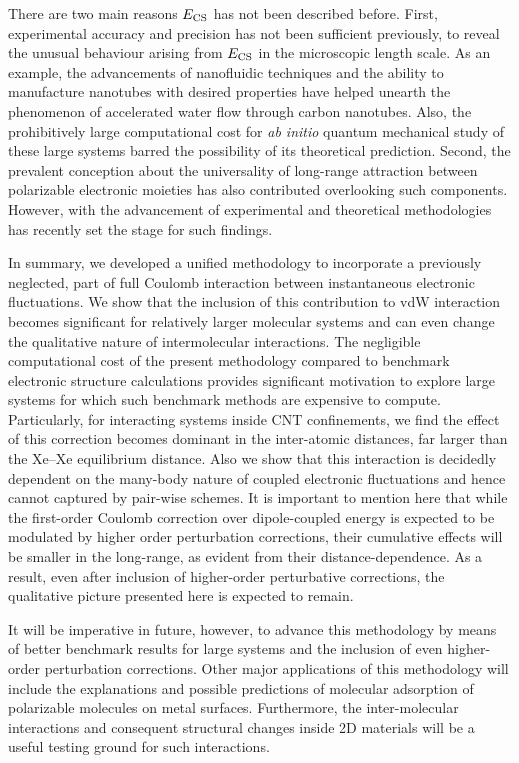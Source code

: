 \documentclass[aps,prl,groupaddress, twocolumn]{revtex4-1}  %
\begin{document}
There are two main reasons $E_{\rm CS}$ has not been described before. First, experimental accuracy and precision has not been sufficient previously, to reveal the unusual behaviour arising from $E_{\rm CS}$ in the microscopic length scale. As an example, the advancements of nanofluidic techniques and the ability to manufacture nanotubes with desired properties have helped unearth the phenomenon of accelerated water flow through carbon nanotubes. Also, the prohibitively large computational cost for \textit{ab initio} quantum mechanical study of these large systems barred the possibility of its theoretical prediction. Second, the prevalent conception about the universality of long-range attraction between polarizable electronic moieties has also contributed overlooking such components. However, with the advancement of experimental and theoretical methodologies has recently set the stage for such findings.

In summary, we developed a unified methodology to incorporate a previously neglected, part of full Coulomb interaction between instantaneous electronic fluctuations. We show that the inclusion of this contribution to vdW interaction becomes significant for relatively larger molecular systems and can even change the qualitative nature of intermolecular interactions. The negligible computational cost of the present methodology compared to benchmark electronic structure calculations provides significant motivation to explore large systems for which such benchmark methods are expensive to compute. Particularly, for interacting systems inside CNT confinements, we find the effect of this correction becomes dominant in the inter-atomic distances, far larger than the Xe--Xe equilibrium distance. Also we show that this interaction is decidedly dependent on the many-body nature of coupled electronic fluctuations and hence cannot captured by pair-wise schemes. It is important to mention here that while the first-order Coulomb correction over dipole-coupled energy is expected to be modulated by higher order perturbation corrections, their cumulative effects will be smaller in the long-range, as evident from their distance-dependence\cite{sadhukhan_prl_2017}. As a result, even after inclusion of higher-order perturbative corrections, the qualitative picture presented here is expected to remain.

It will be imperative in future, however, to advance this methodology by means of better benchmark results for large systems and the inclusion of even higher-order perturbation corrections. Other major applications of this methodology will include the explanations and possible predictions of molecular adsorption of polarizable molecules on metal surfaces. Furthermore, the inter-molecular interactions and consequent structural changes inside 2D materials will be a useful testing ground for such interactions.\\
\end{document}
